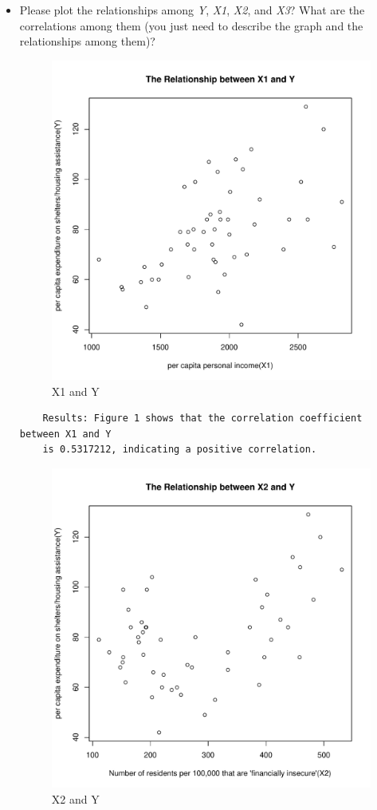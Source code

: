 \documentclass[12pt,letterpaper]{article}
\begin{document}
\begin{itemize}

\item
Please plot the relationships among \emph{Y}, \emph{X1}, \emph{X2}, and \emph{X3}? What are the correlations among them (you just need to describe the graph and the relationships among them)?
\vspace{.5cm}

  



\begin{figure}[h!]\centering
	\caption{\footnotesize X1 and Y}
	\label{fig:plot_1}
	\includegraphics[width=.75\textwidth]{scatter_plot1_X1&Y.pdf}
\end{figure}
\newpage
\begin{verbatim} 
	Results: Figure 1 shows that the correlation coefficient between X1 and Y 
	is 0.5317212, indicating a positive correlation.
\end{verbatim}

\newpage
\begin{figure}[h!]\centering
	\caption{\footnotesize X2 and Y}
	\label{fig:plot_2}
	\includegraphics[width=.75\textwidth]{scatter_plot2_X2&Y.pdf}
\end{figure}


\end{itemize}
\end{document}
